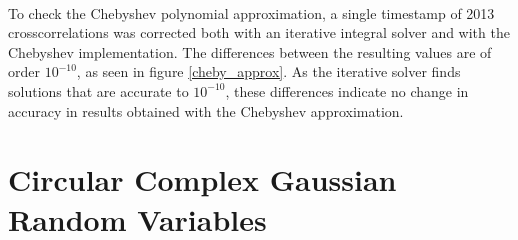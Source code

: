 \documentclass[11pt]{article}
\begin{document}
\paragraph{}
To check the Chebyshev polynomial approximation, a single timestamp of 2013 crosscorrelations was corrected both with an iterative integral solver and with the Chebyshev implementation. The differences between the resulting values are of order $10^{-10}$, as seen in figure \ref{cheby_approx}. As the iterative solver finds solutions that are accurate to $10^{-10}$, these differences indicate no change in accuracy in results obtained with the Chebyshev approximation.

\appendix
\section{Circular Complex Gaussian Random Variables}\label{ccrv}
\end{document}
